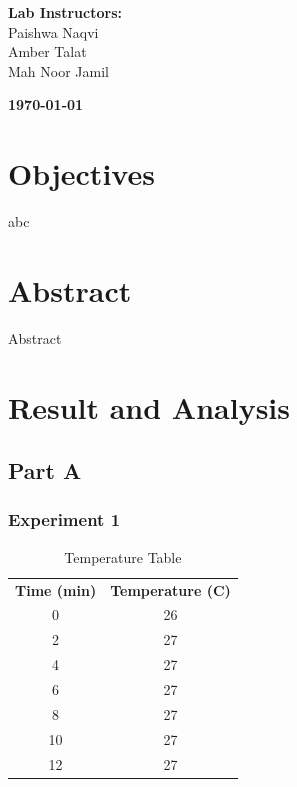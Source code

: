 \documentclass[a4paper, 12pt, english]{article}
\begin{document}
\begin{titlepage}
\begin{center}
		\vspace{45pt}
		\textbf {\large Lab Instructors:}\\[0.2cm]
		\Large {Paishwa Naqvi}\\[0.1cm]
		\Large {Amber Talat}\\[0.1cm]
		\Large {Mah Noor Jamil}\\[0.1cm]
	\end{center}

	\par
	\vfill
	\begin{center}
		\textbf{\today}\\
	\end{center}

\end{titlepage}



\newpage
\section{Objectives}
abc

\section{Abstract}
Abstract

\section{Result and Analysis}
\subsection{Part A}
\subsubsection{Experiment 1}
\begin{table}[H]
	\caption{\label{tab:Table 1} Temperature Table}
	\centering
	\begin{tabular}{c c}
		\toprule
		\textbf{Time (min)}
		   & \textbf{Temperature (\degree C)} \\
		\cmidrule[0.4pt](r{0.125em}){1-1}%
		\cmidrule[0.4pt](lr{0.125em}){2-2}%
		0  & 26                               \\
		2  & 27                               \\
		4  & 27                               \\
		6  & 27                               \\
		8  & 27                               \\
		10 & 27                               \\
		12 & 27                               \\
		\bottomrule
	\end{tabular}
\end{table}
\end{document}
